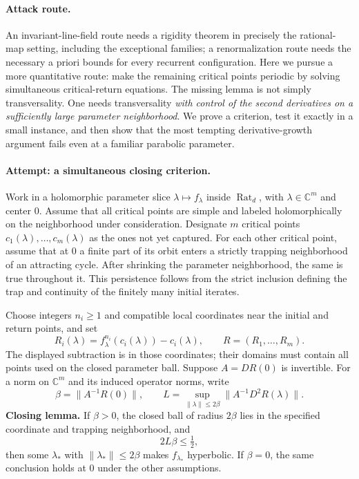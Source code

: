 \documentclass[11pt,a4paper]{article}
\newcommand{\C}{\mathbb{C}}
\numberwithin{equation}{section}
\begin{document}
\paragraph{Attack route.}
An invariant-line-field route needs a rigidity theorem in precisely the
rational-map setting, including the exceptional families; a
renormalization route needs the necessary a priori bounds for every
recurrent configuration. Here we pursue a more quantitative route: make the
remaining critical points periodic by solving simultaneous critical-return
equations. The missing lemma is not simply transversality. One needs
transversality \emph{with control of the second derivatives on a sufficiently
large parameter neighborhood}. We prove a criterion, test it exactly in a
small instance, and then show that the most tempting derivative-growth
argument fails even at a familiar parabolic parameter.

\paragraph{Attempt: a simultaneous closing criterion.}
Work in a holomorphic parameter slice $\lambda\mapsto f_\lambda$ inside
$\operatorname{Rat}_d$, with $\lambda\in\C^m$ and center $0$. Assume that
all critical points are simple and labeled holomorphically on the
neighborhood under consideration. Designate $m$ critical points
$c_1(\lambda),\ldots,c_m(\lambda)$ as the ones not yet captured. For each
other critical point, assume that at $0$ a finite part of its orbit enters
a strictly trapping neighborhood of an attracting cycle. After shrinking
the parameter neighborhood, the same is true throughout it. This
persistence follows from the strict inclusion defining the trap and
continuity of the finitely many initial iterates.

Choose integers $n_i\ge1$ and compatible local coordinates near the
initial and return points, and set
\[
 R_i(\lambda)=f_\lambda^{n_i}(c_i(\lambda))-c_i(\lambda),
 \qquad R=(R_1,\ldots,R_m).
\]
The displayed subtraction is in those coordinates; their domains must
contain all points used on the closed parameter ball. Suppose
$A=DR(0)$ is invertible. For a norm on $\C^m$ and its induced operator
norms, write
\[
 \beta=\|A^{-1}R(0)\|,\qquad
 L=\sup_{\|\lambda\|\le2\beta}\|A^{-1}D^2R(\lambda)\|.
\]
\textbf{Closing lemma.} If $\beta>0$, the closed ball of radius $2\beta$
lies in the specified coordinate and trapping neighborhood, and
\begin{equation}\label{eq155-close}
 2L\beta\le\tfrac12,
\end{equation}
then some $\lambda_*$ with $\|\lambda_*\|\le2\beta$ makes $f_{\lambda_*}$
hyperbolic. If $\beta=0$, the same conclusion holds at $0$ under the other
assumptions.
\end{document}
